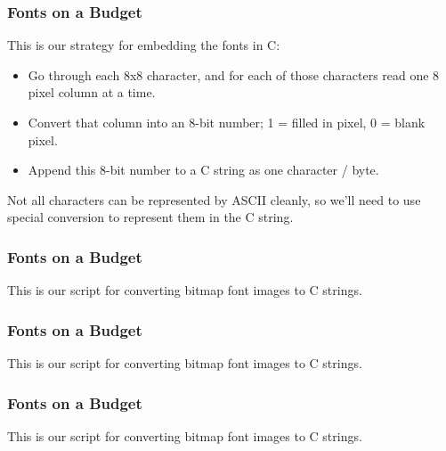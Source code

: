 \documentclass[handout,xcolor]{beamer}
\begin{document}
\begin{frame}
	\frametitle{Fonts on a Budget}
	\pause
	
	This is our strategy for embedding the fonts in C:
	
	\begin{itemize}
		\item Go through each 8x8 character, and for each of those characters read one 8 pixel column at a time.
		\item Convert that column into an 8-bit number; 1 = filled in pixel, 0 = blank pixel.
		\item Append this 8-bit number to a C string as one character / byte.
	\end{itemize}
	
	Not all characters can be represented by ASCII cleanly, so we'll need to use special conversion to represent them in the C string.
\end{frame}

\begin{frame}
	\frametitle{Fonts on a Budget}
	\pause
	
	
	
	This is our script for converting bitmap font images to C strings.
\end{frame}

\begin{frame}
	\frametitle{Fonts on a Budget}
	\pause
	
	
	
	This is our script for converting bitmap font images to C strings.
\end{frame}

\begin{frame}
	\frametitle{Fonts on a Budget}
	\pause
	
	
	
	This is our script for converting bitmap font images to C strings.
\end{frame}
\end{document}

